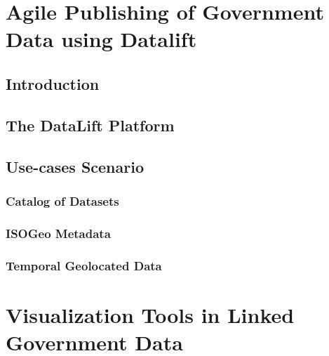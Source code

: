 \documentclass[a4paper,11pt]{report}
\begin{document}
\chapter{Agile Publishing of Government Data using Datalift}

 \section{Introduction}
 
 \section{The DataLift Platform}
 
 \section{Use-cases Scenario}
   \subsection{Catalog of Datasets}
   \subsection{ISOGeo Metadata}
   \subsection{Temporal Geolocated Data}


\chapter{Visualization Tools in Linked Government Data}
\end{document}
